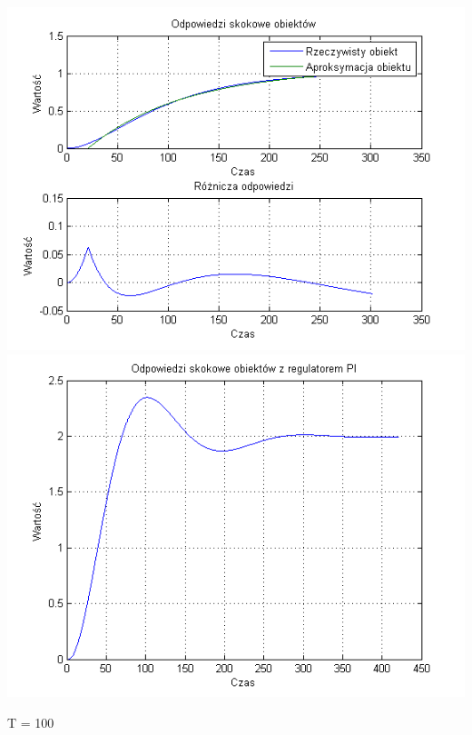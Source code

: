 \documentclass[10pt,a4paper]{article}
\begin{document}
\begin{center}
\includegraphics[scale=1]{images/jeden/skrypt_77.png}\\
\includegraphics[scale=1]{images/jeden/skrypt_78.png}\\
\end{center}
\newpage
T = 100
\end{document}
